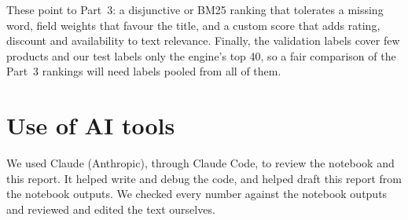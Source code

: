\documentclass[11pt,a4paper]{article}
\begin{document}
These point to Part~3: a disjunctive or BM25 ranking that tolerates a missing
word, field weights that favour the title, and a custom score that adds rating,
discount and availability to text relevance. Finally, the validation labels
cover few products and our test labels only the engine's top 40, so a fair
comparison of the Part~3 rankings will need labels pooled from all of them.

\section*{Use of AI tools}

We used Claude (Anthropic), through Claude Code, to review the notebook and this report. It
helped write and debug the code, and helped draft this report from the notebook outputs. We checked every number against the notebook outputs and reviewed and edited the
text ourselves.
\end{document}
